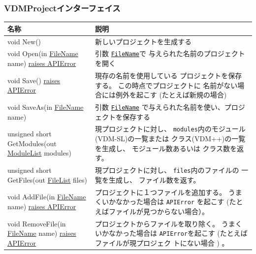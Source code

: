 \documentclass[\pformat,12pt]{jarticle}
\newcommand{\pbs}[1]{\let\temp=\\#1\let\\=\temp}
\newenvironment{interfacetable}{%
  \begin{longtable}{|>{\pbs\raggedright\ttfamily}p{6.6cm}%
                    |>{\pbs\raggedright}p{6.6cm}|} \hline
  \textrm{\bfseries 名称} &  \textbf{説明} \\ \hline
  \endhead
  }{\end{longtable}}
\newcommand{\APIError}{\hyperlink{exception.APIError}{raises APIError}}
\newcommand{\ModuleList}{\hyperlink{type.ModuleList}{ModuleList}}
\newcommand{\FileName}{\hyperlink{type.FileName}{FileName}}
\newcommand{\FileList}{\hyperlink{type.FileList}{FileList}}
\begin{document}
\subsubsection{VDMProjectインターフェイス}
\mbox{}
\begin{interfacetable}
void New()                                    & 新しいプロジェクトを生成する
\\ \hline
void Open(in {\FileName} name) \APIError         & 引数 \texttt{\FileName}で 
                                                与えられた名前のプロジェクトを開く
\\ \hline
void Save() \APIError                         & 現存の名前を使用している
                                                プロジェクトを保存する。
                                                この時点でプロジェクトに
                                                名前がない場合には例外を起こす
                                                (たとえば新規の場合)
\\ \hline
void SaveAs(in {\FileName} name) %
  & 引数 \texttt{\FileName} で与えられた名前を使い、プロジェクトを保存する
\\ \hline
unsigned short GetModules(out {\ModuleList} modules) & 現プロジェクトに対し、
                                                \texttt{modules}内のモジュール(VDM-SL)の一覧または 
                                                クラス(VDM++)の一覧を生成し、
                                                モジュール数あるいは
                                                クラス数を返す。
\\ \hline
\hyperdef{method}{VDMProject::GetFiles}%
unsigned short GetFiles(out {\FileList} files)   & 現プロジェクトに対し、
                                                \texttt{files}内のファイルの
                                                一覧を生成し、 
                                                ファイル数を返す。
\\ \hline
void AddFile(in {\FileName} name) \APIError      & プロジェクトに１つファイルを追加する。
                                                うまくいかなかった場合は 
                                                \texttt{APIError} を起こす 
                                               (たとえばファイルが見つからない場合）。
\\ \hline
void RemoveFile(in {\FileName} name) \APIError   & プロジェクトからファイルを取り除く。
                                                うまくいかなかった場合は 
                                                \texttt{APIError}を起こす
                                                (たとえばファイルが現プロジェク
                                                トにない場合 ) 。
\\ \hline
\end{interfacetable}
\end{document}
